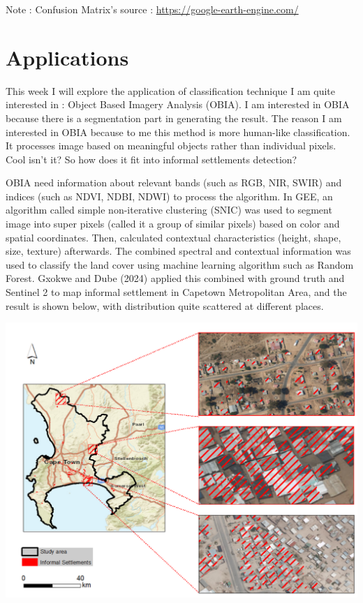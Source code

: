 \documentclass[
  letterpaper,
  DIV=11,
  numbers=noendperiod]{scrreprt}
\begin{document}
Note : Confusion Matrix's source :
\url{https://google-earth-engine.com/}

\hypertarget{applications}{%
\section{Applications}\label{applications}}

This week I will explore the application of classification technique I
am quite interested in : Object Based Imagery Analysis (OBIA). I am
interested in OBIA because there is a segmentation part in generating
the result. The reason I am interested in OBIA because to me this method
is more human-like classification. It processes image based on
meaningful objects rather than individual pixels. Cool isn't it? So how
does it fit into informal settlements detection?

OBIA need information about relevant bands (such as RGB, NIR, SWIR) and
indices (such as NDVI, NDBI, NDWI) to process the algorithm. In GEE, an
algorithm called simple non-iterative clustering (SNIC) was used to
segment image into super pixels (called it a group of similar pixels)
based on color and spatial coordinates. Then, calculated contextual
characteristics (height, shape, size, texture) afterwards. The combined
spectral and contextual information was used to classify the land cover
using machine learning algorithm such as Random Forest. Gxokwe and Dube
(2024) applied this combined with ground truth and Sentinel 2 to map
informal settlement in Capetown Metropolitan Area, and the result is
shown below, with distribution quite scattered at different places.

\includegraphics{images/clipboard-3948245033.png}
\end{document}
